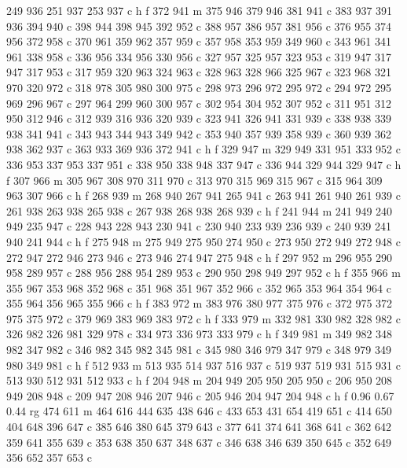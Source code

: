 {{   249 936 251 937 253 937 c
   h f
   372 941 m
   375 946 379 946 381 941 c
   383 937 391 936 394 940 c
   398 944 398 945 392 952 c
   388 957 386 957 381 956 c
   376 955 374 956 372 958 c
   370 961 359 962 357 959 c
   357 958 353 959 349 960 c
   343 961 341 961 338 958 c
   336 956 334 956 330 956 c
   327 957 325 957 323 953 c
   319 947 317 947 317 953 c
   317 959 320 963 324 963 c
   328 963 328 966 325 967 c
   323 968 321 970 320 972 c
   318 978 305 980 300 975 c
   298 973 296 972 295 972 c
   294 972 295 969 296 967 c
   297 964 299 960 300 957 c
   302 954 304 952 307 952 c
   311 951 312 950 312 946 c
   312 939 316 936 320 939 c
   323 941 326 941 331 939 c
   338 938 339 938 341 941 c
   343 943 344 943 349 942 c
   353 940 357 939 358 939 c
   360 939 362 938 362 937 c
   363 933 369 936 372 941 c
   h f
   329 947 m
   329 949 331 951 333 952 c
   336 953 337 953 337 951 c
   338 950 338 948 337 947 c
   336 944 329 944 329 947 c
   h f
   307 966 m
   305 967 308 970 311 970 c
   313 970 315 969 315 967 c
   315 964 309 963 307 966 c
   h f
   268 939 m
   268 940 267 941 265 941 c
   263 941 261 940 261 939 c
   261 938 263 938 265 938 c
   267 938 268 938 268 939 c
   h f
   241 944 m
   241 949 240 949 235 947 c
   228 943 228 943 230 941 c
   230 940 233 939 236 939 c
   240 939 241 940 241 944 c
   h f
   275 948 m
   275 949 275 950 274 950 c
   273 950 272 949 272 948 c
   272 947 272 946 273 946 c
   273 946 274 947 275 948 c
   h f
   297 952 m
   296 955 290 958 289 957 c
   288 956 288 954 289 953 c
   290 950 298 949 297 952 c
   h f
   355 966 m
   355 967 353 968 352 968 c
   351 968 351 967 352 966 c
   352 965 353 964 354 964 c
   355 964 356 965 355 966 c
   h f
   383 972 m
   383 976 380 977 375 976 c
   372 975 372 975 375 972 c
   379 969 383 969 383 972 c
   h f
   333 979 m
   332 981 330 982 328 982 c
   326 982 326 981 329 978 c
   334 973 336 973 333 979 c
   h f
   349 981 m
   349 982 348 982 347 982 c
   346 982 345 982 345 981 c
   345 980 346 979 347 979 c
   348 979 349 980 349 981 c
   h f
   512 933 m
   513 935 514 937 516 937 c
   519 937 519 931 515 931 c
   513 930 512 931 512 933 c
   h f
   204 948 m
   204 949 205 950 205 950 c
   206 950 208 949 208 948 c
   209 947 208 946 207 946 c
   205 946 204 947 204 948 c
   h f
   0.96 0.67 0.44 rg
   474 611 m
   464 616 444 635 438 646 c
   433 653 431 654 419 651 c
   414 650 404 648 396 647 c
   385 646 380 645 379 643 c
   377 641 374 641 368 641 c
   362 642 359 641 355 639 c
   353 638 350 637 348 637 c
   346 638 346 639 350 645 c
   352 649 356 652 357 653 c
}}
